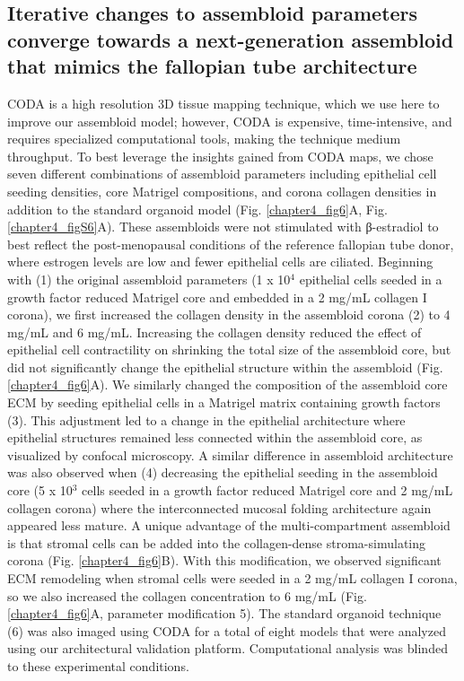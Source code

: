 \begin{refsection}
    \subsection{Iterative changes to assembloid parameters converge towards a next-generation assembloid that mimics the fallopian tube architecture}
    CODA is a high resolution 3D tissue mapping technique, which we use here to improve our assembloid model; however, CODA is expensive, time-intensive, and requires specialized computational tools, making the technique medium throughput. To best leverage the insights gained from CODA maps, we chose seven different combinations of assembloid parameters including epithelial cell seeding densities, core Matrigel compositions, and corona collagen densities in addition to the standard organoid model (Fig. \ref{chapter4_fig6}A, Fig. \ref{chapter4_figS6}A). These assembloids were not stimulated with β-estradiol to best reflect the post-menopausal conditions of the reference fallopian tube donor, where estrogen levels are low\cite{brodowska2021a,elmlinger2002a,andrew2022a} and fewer epithelial cells are ciliated\cite{crow1994a,donnez1985a,brodowska2021a}. Beginning with (1) the original assembloid parameters (1 x 10$^4$ epithelial cells seeded in a growth factor reduced Matrigel core and embedded in a 2 mg/mL collagen I corona), we first increased the collagen density in the assembloid corona (2) to 4 mg/mL and 6 mg/mL. Increasing the collagen density reduced the effect of epithelial cell contractility on shrinking the total size of the assembloid core, but did not significantly change the epithelial structure within the assembloid (Fig. \ref{chapter4_fig6}A). We similarly changed the composition of the assembloid core ECM by seeding epithelial cells in a Matrigel matrix containing growth factors (3). This adjustment led to a change in the epithelial architecture where epithelial structures remained less connected within the assembloid core, as visualized by confocal microscopy. A similar difference in assembloid architecture was also observed when (4) decreasing the epithelial seeding in the assembloid core (5 x 10$^3$ cells seeded in a growth factor reduced Matrigel core and 2 mg/mL collagen corona) where the interconnected mucosal folding architecture again appeared less mature. 
    A unique advantage of the multi-compartment assembloid is that stromal cells can be added into the collagen-dense stroma-simulating corona (Fig. \ref{chapter4_fig6}B). With this modification, we observed significant ECM remodeling when stromal cells were seeded in a 2 mg/mL collagen I corona, so we also increased the collagen concentration to 6 mg/mL (Fig. \ref{chapter4_fig6}A, parameter modification 5). The standard organoid technique (6) was also imaged using CODA for a total of eight models that were analyzed using our architectural validation platform. Computational analysis was blinded to these experimental conditions.

\end{refsection}
